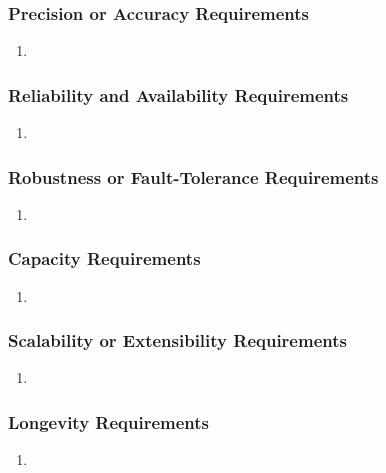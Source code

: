 \documentclass[]{article}
\begin{document}
\subsubsection{Precision or Accuracy Requirements}
\label{ssub:precision_or_accuracy_requirements}
\begin{enumerate}[{PR-PA}1. ]
	\item 
\end{enumerate}

\subsubsection{Reliability and Availability Requirements}
\label{ssub:reliability_and_availability_requirements}
\begin{enumerate}[{PR-RA}1. ]
	\item 
\end{enumerate}

\subsubsection{Robustness or Fault-Tolerance Requirements}
\label{ssub:robustness_or_fault_tolerance_requirements}
\begin{enumerate}[{PR-RFT}1. ]
	\item 
\end{enumerate}

\subsubsection{Capacity Requirements}
\label{ssub:capacity_requirements}
\begin{enumerate}[{PR-C}1. ]
	\item 
\end{enumerate}

\subsubsection{Scalability or Extensibility Requirements}
\label{ssub:scalability_or_extensibility_requirements}
\begin{enumerate}[{PR-SE}1. ]
	\item 
\end{enumerate}

\subsubsection{Longevity Requirements}
\label{ssub:longevity_requirements}
\begin{enumerate}[{PR-L}1. ]
	\item 
\end{enumerate}
\end{document}
